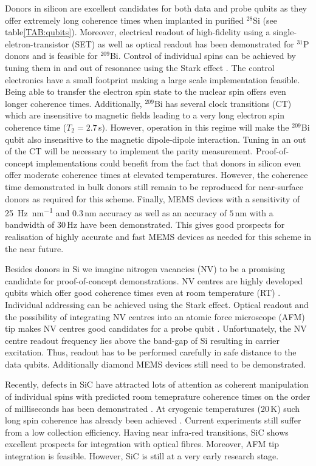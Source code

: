 Donors in silicon are excellent candidates for both data and probe qubits as they offer extremely long coherence times when implanted in purified $^{28}$Si (see table\@ \ref{TAB:qubits}). Moreover, electrical readout of high-fidelity using a single-eletron-transistor (SET) \cite{Pla2012,Pla2013,Muhonen2014} as well as optical \cite{Lo2015} readout has been demonstrated for $^{31}$P donors and is feasible for $^{209}$Bi. Control of individual spins can be achieved by tuning them in and out of resonance using the Stark effect \cite{Pica2014}. The control electronics have a small footprint making a large scale implementation feasible. Being able to transfer the electron spin state to the nuclear spin offers even longer coherence times. Additionally, $^{209}$Bi has several clock transitions (CT) which are insensitive to magnetic fields leading to a very long electron spin coherence time ($T_2=2.7\, $s). However, operation in this regime will make the $^{209}$Bi qubit also insensitive to the magnetic dipole-dipole interaction. Tuning in an out of the CT will be necessary to implement the parity measurement. Proof-of-concept implementations could benefit from the fact that donors in silicon even offer moderate coherence times at elevated temperatures. However, the coherence time demonstrated in bulk donors still remain to be reproduced for near-surface donors as required for this scheme.
Finally, MEMS devices with a sensitivity of \SI{25}{\hertz\per nm} and $0.3\, $nm accuracy \cite{Chu2003} as well as an accuracy of $5\, $nm with a bandwidth of $30\, $Hz have been demonstrated. This gives good prospects for realisation of highly accurate and fast MEMS devices as needed for this scheme in the near future. 


Besides donors in Si we imagine nitrogen vacancies (NV) to be a promising candidate for proof-of-concept demonstrations. NV centres are highly developed qubits \cite{Bar-Gill2013} which offer good coherence times even at room temperature (RT) \cite{Balasubramanian2009}. Individual addressing can be achieved using the Stark effect. Optical readout and the possibility of integrating NV centres into an atomic force microscope (AFM) tip makes NV centres good candidates for a probe qubit \cite{Grinolds2013}. Unfortunately, the NV centre readout frequency lies above the band-gap of Si resulting in carrier excitation. Thus, readout has to be performed carefully in safe distance to the data qubits. Additionally diamond MEMS devices still need to be demonstrated.

Recently, defects in SiC have attracted lots of attention \cite{Morello2015} as coherent manipulation of individual spins with predicted room temeprature coherence times on the order of milliseconds has been demonstrated \cite{Widmann2014}. At cryogenic temperatures ($20\, $K) such long spin coherence has already been achieved \cite{Christle2014}. Current experiments still suffer from a low collection efficiency. Having near infra-red transitions, SiC shows excellent prospects for integration with optical fibres. Moreover, AFM tip integration is feasible. However, SiC is still at a very early research stage.  


